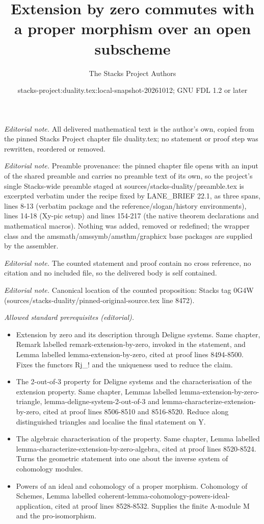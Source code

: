 \documentclass[10pt,a4paper]{amsart}
\title{Extension by zero commutes with a proper morphism over an open subscheme}
\author{The Stacks Project Authors}
\date{stacks-project:duality.tex:local-snapshot-20261012; GNU FDL 1.2 or later}
\theoremstyle{plain}
\theoremstyle{definition}
\theoremstyle{remark}
\numberwithin{equation}{subsection}
\begin{document}
\maketitle
\noindent\textit{Editorial note.} All delivered mathematical text is the author's own, copied from the pinned Stacks Project chapter file duality.tex; no statement or proof step was rewritten, reordered or removed.\par\medskip
\noindent\textit{Editorial note.} Preamble provenance: the pinned chapter file opens with an input of the shared preamble and carries no preamble text of its own, so the project's single Stacks-wide preamble staged at sources/stacks-duality/preamble.tex is excerpted verbatim under the recipe fixed by LANE\_BRIEF 22.1, as three spans, lines 8-13 (verbatim package and the reference/slogan/history environments), lines 14-18 (Xy-pic setup) and lines 154-217 (the native theorem declarations and mathematical macros). Nothing was added, removed or redefined; the wrapper class and the amsmath/amssymb/amsthm/graphicx base packages are supplied by the assembler.\par\medskip
\noindent\textit{Editorial note.} The counted statement and proof contain no cross reference, no citation and no included file, so the delivered body is self contained.\par\medskip
\noindent\textit{Editorial note.} Canonical location of the counted proposition: Stacks tag 0G4W (sources/stacks-duality/pinned-original-source.tex line 8472).\par\medskip
\noindent\textit{Allowed standard prerequisites (editorial).}\begin{itemize}
\item Extension by zero and its description through Deligne systems. Same chapter, Remark labelled remark-extension-by-zero, invoked in the statement, and Lemma labelled lemma-extension-by-zero, cited at proof lines 8494-8500. Fixes the functors Rj\_! and the uniqueness used to reduce the claim.
\item The 2-out-of-3 property for Deligne systems and the characterisation of the extension property. Same chapter, Lemmas labelled lemma-extension-by-zero-triangle, lemma-deligne-system-2-out-of-3 and lemma-characterize-extension-by-zero, cited at proof lines 8506-8510 and 8516-8520. Reduce along distinguished triangles and localise the final statement on Y.
\item The algebraic characterisation of the property. Same chapter, Lemma labelled lemma-characterize-extension-by-zero-algebra, cited at proof lines 8520-8524. Turns the geometric statement into one about the inverse system of cohomology modules.
\item Powers of an ideal and cohomology of a proper morphism. Cohomology of Schemes, Lemma labelled coherent-lemma-cohomology-powers-ideal-application, cited at proof lines 8528-8532. Supplies the finite A-module M and the pro-isomorphism.
\end{itemize}\medskip
\end{document}
